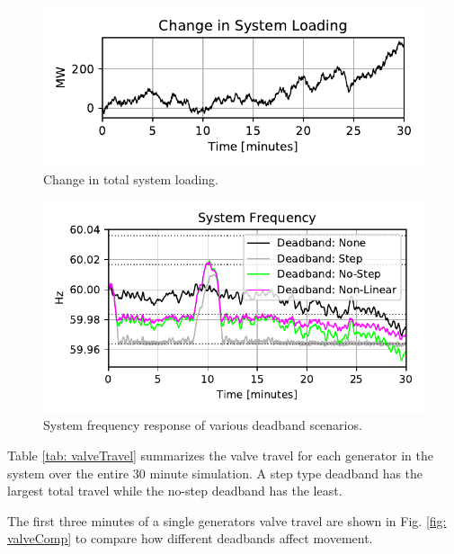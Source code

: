 \begin{figure}[!ht]
\centering
\includegraphics[width=\linewidth]{figures/miniWECCuniAccPloadChange}
\caption{Change in total system loading.}
\label{fig: systemLoading}
\end{figure}%
\begin{figure}[!ht]
\centering
\includegraphics[width=\linewidth]{figures/miniWECCnoiseNLdroopDBFreq}
\caption{System frequency response of various deadband scenarios.}
\label{fig: sysFreqDB}
\end{figure}

Table \ref{tab: valveTravel} summarizes the valve travel for each generator in the system over the entire 30 minute simulation. 
A step type deadband has the largest total travel while the no-step deadband has the least.



The first three minutes of a single generators valve travel are shown in Fig. \ref{fig: valveComp} to compare how different deadbands affect movement.

